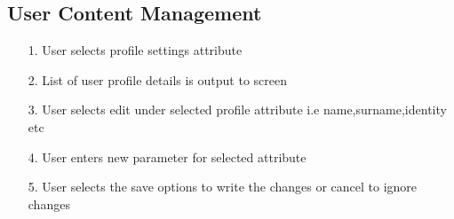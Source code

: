 \subsection {User Content Management}
\begin{itemize}
\item[1.] User selects profile settings attribute
\item[2.] List of user profile details is output to screen
\item[3.] User selects edit under selected profile attribute i.e name,surname,identity etc
\item[4.] User enters new parameter for selected attribute
\item[5.] User selects the save options to write the changes or cancel to ignore changes
\end{itemize}

